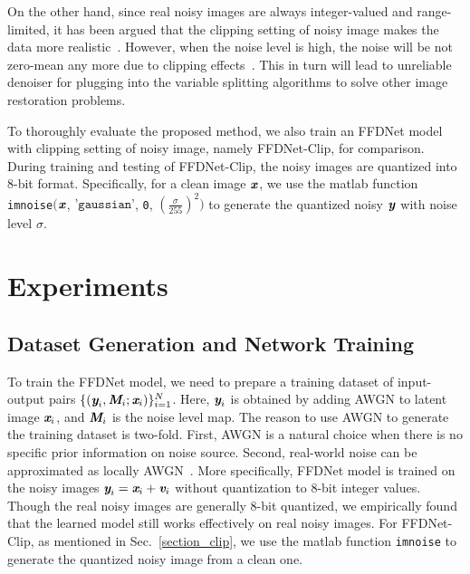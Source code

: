\documentclass[journal]{IEEEtran}
\begin{document}
On the other hand, since real noisy images are always integer-valued and range-limited,
it has been argued that the clipping setting of noisy image makes the data more realistic~\cite{schmidt2014shrinkage}.
However, when the noise level is high, the noise will be not zero-mean any more due to clipping effects~\cite{Plotz_2017_CVPR}.
This in turn will lead to unreliable denoiser for plugging into the variable splitting algorithms to solve other image restoration problems.


To thoroughly evaluate the proposed method, we also train an FFDNet model with clipping setting of noisy image, namely FFDNet-Clip, for comparison.
During training and testing of FFDNet-Clip, the noisy images are quantized into 8-bit format. Specifically, for a clean image $\textbf{\emph{x}}$, we use the matlab function \texttt{imnoise}$($$\textbf{\emph{x}}$, $\texttt{'gaussian'}$, \texttt{0}, \texttt{$(\frac{\sigma}{255})^2$}$)$ to generate the quantized noisy $\textbf{\emph{y}}$ with noise level $\sigma$.



\section{Experiments}\label{sec:experiments}

\subsection{Dataset Generation and Network Training}\label{section_train}
To train the FFDNet model, we need to prepare a training dataset of input-output pairs $\{(\emph{\textbf{y}}_i, \emph{\textbf{M}}_{i}; \emph{\textbf{x}}_i)\}_{i = 1}^N$. Here, $\emph{\textbf{y}}_i$ is obtained by adding AWGN to latent image $\emph{\textbf{x}}_i$, and $\emph{\textbf{M}}_{i}$ is the noise level map.
The reason to use AWGN to generate the training dataset is two-fold. First, AWGN is a natural choice when there is no specific prior information on noise source. Second, real-world noise can be approximated as locally AWGN~\cite{lee1981refined}. More specifically, FFDNet model is trained on the noisy images $\emph{\textbf{y}}_i = \emph{\textbf{x}}_i + \emph{\textbf{v}}_i$ without quantization to 8-bit integer values.
Though the real noisy images are generally 8-bit quantized, we empirically found that the learned model still works effectively on real noisy images.
For FFDNet-Clip, as mentioned in Sec.~\ref{section_clip}, we use the matlab function \texttt{imnoise} to generate the  quantized noisy image from a clean one.
\end{document}
